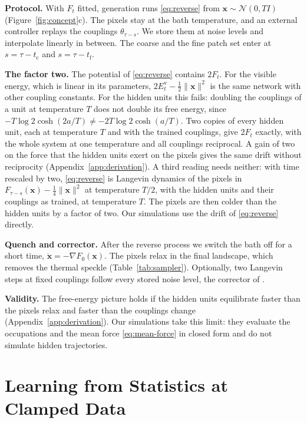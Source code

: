 \documentclass{article}
\newif\ifshownotes
\newcommand{\budget}[1]{\ifshownotes{\noindent\small\itshape\textcolor{notegray}{[Budget: #1]}\par}\fi}
\newcommand{\x}{\bm{x}}
\newcommand{\Evis}{E^{\mathrm{v}}}
\begin{document}
\textbf{Protocol.}
With $F_t$ fitted, generation runs \eqref{eq:reverse} from
$\x\sim\mathcal{N}(0,TI)$ (Figure~\ref{fig:concept}c). The pixels stay at the
bath temperature, and an external controller replays the couplings
$\theta_{\tau-s}$. We store them at \nSlices{} noise levels and interpolate
linearly in between. The coarse and the fine patch set enter at
$s=\tau-t_{\mathrm c}$ and $s=\tau-t_{\mathrm f}$.

\textbf{The factor two.}
The potential of \eqref{eq:reverse} contains $2F_t$. For the visible energy,
which is linear in its parameters, $2\Evis_t-\tfrac12\lVert\x\rVert^{2}$ is the
same network with other coupling constants. For the hidden units this fails:
doubling the couplings of a unit at temperature $T$ does not double its free
energy, since $-T\log2\cosh(2a/T)\neq-2T\log2\cosh(a/T)$. Two copies of every
hidden unit, each at temperature $T$ and with the trained couplings, give
$2F_t$ exactly, with the whole system at one temperature and all couplings
reciprocal. A gain of two on the force that the hidden units exert on the
pixels gives the same drift without reciprocity
(Appendix~\ref{app:derivation}). A third reading needs neither: with time
rescaled by two, \eqref{eq:reverse} is Langevin dynamics of the pixels in
$F_{\tau-s}(\x)-\tfrac14\lVert\x\rVert^{2}$ at temperature $T/2$, with the
hidden units and their couplings as trained, at temperature $T$. The pixels
are then colder than the hidden units by a factor of two. Our simulations use
the drift of \eqref{eq:reverse} directly.

\textbf{Quench and corrector.}
After the reverse process we switch the bath off for a short time,
$\dot{\x}=-\nabla F_{0}(\x)$. The pixels relax in the final landscape, which
removes the thermal speckle (Table~\ref{tab:sampler}). Optionally, two Langevin
steps at fixed couplings follow every stored noise level, the corrector of
\citet{song2021score}.

\textbf{Validity.}
The free-energy picture holds if the hidden units equilibrate faster than the
pixels relax and faster than the couplings change
(Appendix~\ref{app:derivation}). Our simulations take this limit: they evaluate
the occupations and the mean force \eqref{eq:mean-force} in closed form and do
not simulate hidden trajectories.

\section{Learning from Statistics at Clamped Data}
\label{sec:learning}
\budget{1.0 page planned; about 1.4 with the derivation in the main text}
\end{document}
